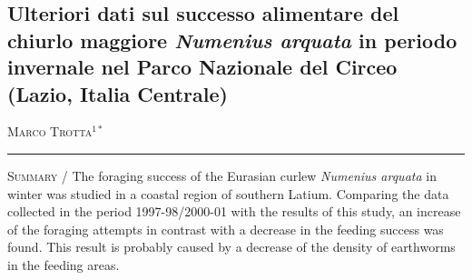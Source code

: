 \setcounter{figure}{0}
\setcounter{table}{0}

\begin{adjustwidth}{-3.5cm}{0cm}
\pagestyle{CIOpage}
\chapter*[Successo alimentare del chiurlo maggiore in periodo invernale]{Ulteriori dati sul successo alimentare del chiurlo maggiore \textbf{\textit{Numenius arquata}}\textbf{ in periodo invernale nel Parco Nazionale del Circeo (Lazio, Italia Centrale)}}

\textsc{Marco Trotta}$^{1*}$ \\

\noindent\color{MUSEBLUE}\rule{27cm}{2pt}
\vspace{1cm}
\end{adjustwidth}


{\small
\noindent \textsc{\color{MUSEBLUE} Summary} / The foraging success of the Eurasian curlew \textit{Numenius
arquata} in winter was studied in a coastal region of southern Latium. Comparing the data collected in the period 1997-98/2000-01 with the results of this study, an increase of the foraging attempts in contrast
with a decrease in the feeding success was found. This result is probably caused by a decrease of the density of earthworms in the feeding areas.\\
}
\vspace{1cm}


